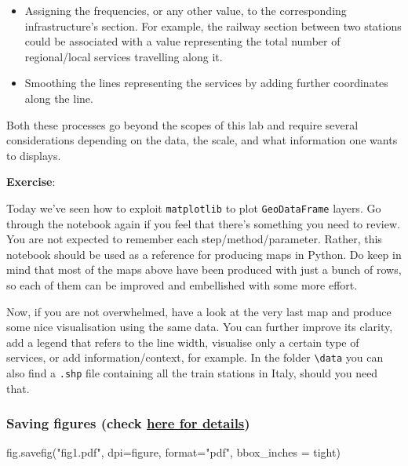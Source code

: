 \documentclass[
  letterpaper,
  DIV=11,
  numbers=noendperiod]{scrreprt}
\newenvironment{Shaded}{\begin{snugshade}}{\end{snugshade}}
\newcommand{\BuiltInTok}[1]{\textcolor[rgb]{0.00,0.23,0.31}{#1}}
\newcommand{\NormalTok}[1]{\textcolor[rgb]{0.00,0.23,0.31}{#1}}
\newcommand{\OperatorTok}[1]{\textcolor[rgb]{0.37,0.37,0.37}{#1}}
\newcommand{\StringTok}[1]{\textcolor[rgb]{0.13,0.47,0.30}{#1}}
\providecommand{\tightlist}{%
  \setlength{\itemsep}{0pt}\setlength{\parskip}{0pt}}\usepackage{longtable,booktabs,array}
\begin{document}
\begin{itemize}
\tightlist
\item
  Assigning the frequencies, or any other value, to the corresponding
  infrastructure's section. For example, the railway section between two
  stations could be associated with a value representing the total
  number of regional/local services travelling along it.
\item
  Smoothing the lines representing the services by adding further
  coordinates along the line.
\end{itemize}

Both these processes go beyond the scopes of this lab and require
several considerations depending on the data, the scale, and what
information one wants to displays.

\textbf{Exercise}:

Today we've seen how to exploit \texttt{matplotlib} to plot
\texttt{GeoDataFrame} layers. Go through the notebook again if you feel
that there's something you need to review. You are not expected to
remember each step/method/parameter. Rather, this notebook should be
used as a reference for producing maps in Python. Do keep in mind that
most of the maps above have been produced with just a bunch of rows, so
each of them can be improved and embellished with some more effort.

Now, if you are not overwhelmed, have a look at the very last map and
produce some nice visualisation using the same data. You can further
improve its clarity, add a legend that refers to the line width,
visualise only a certain type of services, or add information/context,
for example. In the folder \texttt{\textbackslash{}data} you can also
find a \texttt{.shp} file containing all the train stations in Italy,
should you need that.

\subsubsection{\texorpdfstring{Saving figures (check
\href{https://matplotlib.org/stable/api/_as_gen/matplotlib.pyplot.savefig.html}{here
for
details})}{Saving figures (check here for details)}}\label{saving-figures-check-here-for-details}

\begin{Shaded}
\begin{Highlighting}[]
\NormalTok{fig.savefig(}\StringTok{"fig1.pdf"}\NormalTok{, dpi}\OperatorTok{=}\StringTok{\textquotesingle{}figure\textquotesingle{}}\NormalTok{, }\BuiltInTok{format}\OperatorTok{=}\StringTok{"pdf"}\NormalTok{, bbox\_inches }\OperatorTok{=} \StringTok{\textquotesingle{}tight\textquotesingle{}}\NormalTok{)}
\end{Highlighting}
\end{Shaded}
\end{document}
